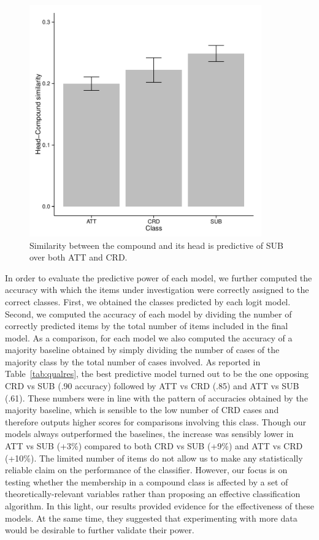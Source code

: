 \documentclass[output=paper]{langsci/langscibook}
\begin{document}
\begin{figure}[t!]
\begin{center}
\includegraphics[width=10cm]{figures/barplot2.pdf}
\caption{Similarity between the compound and its head is predictive of SUB over both ATT and CRD.}\label{fig:bar2}
\end{center}
\end{figure}


In order to evaluate the predictive power of each model, we further computed the accuracy with which the items under investigation were correctly assigned to the correct classes. First, we obtained the classes predicted by each logit model. Second, we computed the accuracy of each model by dividing the number of correctly predicted items by the total number of items included in the final model. As a comparison, for each model we also computed the accuracy of a majority baseline obtained by simply dividing the number of cases of the majority class by the total number of cases involved.  As reported in Table~\ref{tab:qualres}, the best predictive model turned out to be the one opposing CRD vs SUB (.90 accuracy) followed by ATT vs CRD (.85) and ATT vs SUB (.61). These numbers were in line with the pattern of accuracies obtained by the majority baseline, which is sensible to the low number of CRD cases and therefore outputs higher scores for comparisons involving this class. Though our models always outperformed the baselines, the increase was sensibly lower in ATT vs SUB (+3\%) compared to both CRD vs SUB (+9\%) and ATT vs CRD (+10\%). The limited number of items do not allow us to make any statistically reliable claim on the performance of the classifier. However, our focus is on testing whether the membership in a compound class is affected by a set of theoretically-relevant variables rather than proposing an effective classification algorithm. In this light, our results provided evidence for the effectiveness of these models. At the same time, they suggested that experimenting with more data would be desirable to further validate their power.
\end{document}
